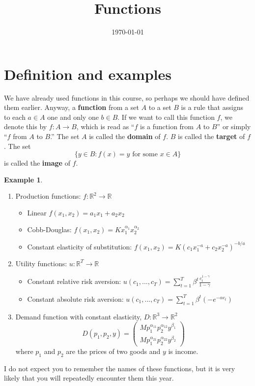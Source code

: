 \documentclass[12pt,reqno]{amsart}
\title{Functions}
\date{\today}
\theoremstyle{definition}
\newtheorem{example}{Example}[section]
\def\R{\mathbb{R}}
\renewcommand{\to}{{\rightarrow}}
\begin{document}
\maketitle

\section{Definition and examples}

We have already used functions in this course, so perhaps we should
have defined them earlier. Anyway, a \textbf{function} from a set $A$
to a set $B$ is a rule that assigns to each $a \in A$ one and only one
$b \in B$. If we want to call this function $f$, we denote this by
$f:A \to B$, which is read as ``$f$ is a function from $A$ to $B$'' or
simply ``$f$ from $A$ to $B$.'' The set $A$ is called the
\textbf{domain} of $f$. $B$ is called the \textbf{target} of $f$. The
set 
\[ \{y  \in B:  f(x) = y \text{ for some } x \in A \} \]
is called the \textbf{image} of $f$. 


\begin{example}$\;$
\begin{enumerate}
\item Production functions: $f:\R^2 \to \R$ 
  \begin{itemize}
  \item Linear $ f(x_1,x_2) = a_1 x_1 + a_2 x_2 $
  \item Cobb-Douglas: $f(x_1,x_2) = K x_1^{\alpha_1} x_2^{\alpha_2}$
  \item Constant elasticity of substitution: $f(x_1,x_2) = K (c_1
    x_1^{-a} + c_2 x_2^{-a})^{-b/a}$
  \end{itemize}
\item Utility functions: $u: \R^T \to \R$
  \begin{itemize}
  \item Constant relative risk aversion: $u(c_1,...,c_T) =
    \sum_{t=1}^T \beta^t \frac{c_t^{1-\gamma}}{1-\gamma}$
  \item Constant absolute risk aversion: $u(c_1,...,c_T) =
    \sum_{t=1}^T \beta^t (-e^{-\alpha c_t})$
  \end{itemize}
\item Demand function with constant elasticity,  $D:\R^3 \to \R^2$
  \[ D(p_1,p_2,y) = \begin{pmatrix} M p_1^{\alpha_{11}}
    p_2^{\alpha_{12}} y^{\beta_1} \\
    M p_1^{\alpha_{21}} p_2^{\alpha_{22}} y^{\beta_2}
  \end{pmatrix}
  \]  
  where $p_1$ and $p_2$ are the prices of two goods and $y$ is income.
\end{enumerate}
I do not expect you to remember the names of these functions, but it
is very likely that you will repeatedly encounter them this year. 
\end{example}
\end{document}
